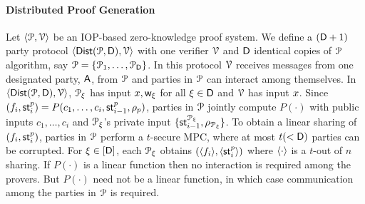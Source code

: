 \paragraph*{Distributed Proof Generation}\label{pg:dpzk}
Let $\langle \mathcal{P},\mathcal{V}\rangle$ be an IOP-based zero-knowledge proof system. We define a $(\mathsf{D} + 1)$ party protocol $\langle \mathsf{Dist}(\mathcal{P}, \mathsf{D}),\mathcal{V}\rangle$ with one verifier $\mathcal{V}$ and $\mathsf{D}$ identical copies of $\mathcal{P}$ algorithm, say $\mathcal{P} = \{\mathcal{P}_1, \ldots, \mathcal{P}_{\mathsf{D}}\}$. In this protocol $\mathcal{V}$ receives messages from one designated party, $\mathsf{A}$, from $\mathcal{P}$ and parties in $\mathcal{P}$ can interact among themselves. In $\langle \mathsf{Dist}(\mathcal{P}, \mathsf{D}),\mathcal{V}\rangle$, $\mathcal{P}_\xi$ has input ${x}, \mathsf{w}_\xi$ for all $\xi \in \mathsf{D}$ and $\mathcal{V}$ has input ${x}$.
Since $(f_i, \mathsf{st}^p_i) = P(c_1, \ldots, c_i, \mathsf{st}^p_{i-1}, \rho_{p})$, parties in $\mathcal{P}$ jointly compute $P(\cdot)$ with public inputs $c_1, \ldots, c_i$ and $\mathcal{P}_\xi$'s private input $\{\mathsf{st}^{\mathcal{P}_\xi}_{i-1}, \rho_{\mathcal{P}_\xi}\}$. To obtain a linear sharing of $(f_i, \mathsf{st}^p_i)$, parties in $\mathcal{P}$ perform a $t$-secure MPC, where at most $t(<\mathsf{D})$ parties can be corrupted. For $\xi \in [\mathsf{D}]$, each $\mathcal{P}_\xi$ obtains $(\langle f_i \rangle, \langle \mathsf{st}^{p}_i \rangle)$ where $\langle \cdot \rangle$ is a $t$-out of $n$ sharing. If $P(\cdot)$ is a linear function then no interaction is required among the provers. But $P(\cdot)$ need not be a linear function, in which case communication among the parties in $\mathcal{P}$ is required. 

